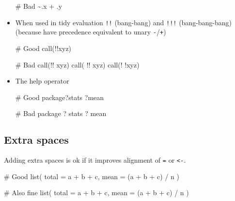\documentclass[twoside, pagesize, fontsize=11pt, dvipsnames]{scrreport} %
\newenvironment{Shaded}{\begin{snugshade}}{\end{snugshade}}
\newcommand{\AttributeTok}[1]{\textcolor[rgb]{0.40,0.45,0.13}{#1}}
\newcommand{\CommentTok}[1]{\textcolor[rgb]{0.37,0.37,0.37}{#1}}
\newcommand{\FunctionTok}[1]{\textcolor[rgb]{0.28,0.35,0.67}{#1}}
\newcommand{\NormalTok}[1]{\textcolor[rgb]{0.00,0.23,0.31}{#1}}
\newcommand{\SpecialCharTok}[1]{\textcolor[rgb]{0.37,0.37,0.37}{#1}}
\begin{document}
\begin{itemize}
\begin{Shaded}
\begin{Highlighting}[]
\CommentTok{\# Bad}
\SpecialCharTok{\textasciitilde{}}\NormalTok{.x }\SpecialCharTok{+}\NormalTok{ .y}
\end{Highlighting}
\end{Shaded}
\item
  When used in tidy evaluation \texttt{!!} (bang-bang) and \texttt{!!!}
  (bang-bang-bang) (because have precedence equivalent to unary
  \texttt{-}/\texttt{+})

\begin{Shaded}
\begin{Highlighting}[]
\CommentTok{\# Good}
\FunctionTok{call}\NormalTok{(}\SpecialCharTok{!!}\NormalTok{xyz)}

\CommentTok{\# Bad}
\FunctionTok{call}\NormalTok{(}\SpecialCharTok{!!}\NormalTok{ xyz)}
\FunctionTok{call}\NormalTok{( }\SpecialCharTok{!!}\NormalTok{ xyz)}
\FunctionTok{call}\NormalTok{(}\SpecialCharTok{!} \SpecialCharTok{!}\NormalTok{xyz)}
\end{Highlighting}
\end{Shaded}
\item
  The help operator

\begin{Shaded}
\begin{Highlighting}[]
\CommentTok{\# Good}
\NormalTok{package?stats}
\NormalTok{?mean}

\CommentTok{\# Bad}
\NormalTok{package ? stats}
\NormalTok{? mean}
\end{Highlighting}
\end{Shaded}
\end{itemize}

\hypertarget{extra-spaces}{%
\subsection{Extra spaces}\label{extra-spaces}}

Adding extra spaces is ok if it improves alignment of \texttt{=} or
\texttt{\textless{}-}.

\begin{Shaded}
\begin{Highlighting}[]
\CommentTok{\# Good}
\FunctionTok{list}\NormalTok{(}
  \AttributeTok{total =}\NormalTok{ a }\SpecialCharTok{+}\NormalTok{ b }\SpecialCharTok{+}\NormalTok{ c,}
  \AttributeTok{mean  =}\NormalTok{ (a }\SpecialCharTok{+}\NormalTok{ b }\SpecialCharTok{+}\NormalTok{ c) }\SpecialCharTok{/}\NormalTok{ n}
\NormalTok{)}

\CommentTok{\# Also fine}
\FunctionTok{list}\NormalTok{(}
  \AttributeTok{total =}\NormalTok{ a }\SpecialCharTok{+}\NormalTok{ b }\SpecialCharTok{+}\NormalTok{ c,}
  \AttributeTok{mean =}\NormalTok{ (a }\SpecialCharTok{+}\NormalTok{ b }\SpecialCharTok{+}\NormalTok{ c) }\SpecialCharTok{/}\NormalTok{ n}
\NormalTok{)}
\end{Highlighting}
\end{Shaded}
\end{document}
